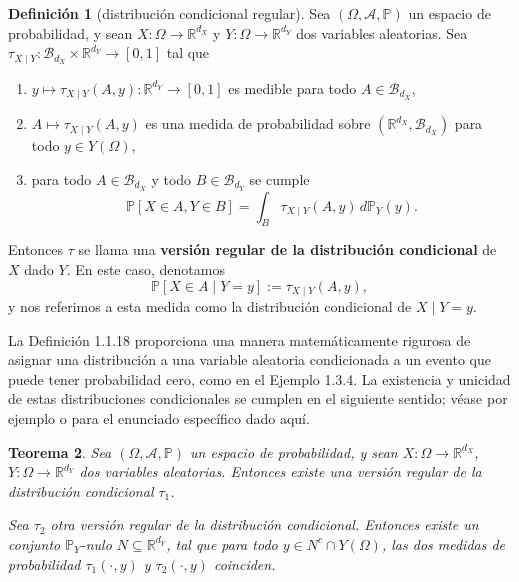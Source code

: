 \documentclass[11pt]{report}
\newenvironment{tcolorbox}[1][]{\par\medskip\noindent\ignorespaces}{\par\medskip}
\theoremstyle{definition}
\newtheorem{definicion}{Definición}[section]
\theoremstyle{plain}
\newtheorem{teorema}[definicion]{Teorema}
\numberwithin{equation}{section}
\begin{document}
\begin{tcolorbox}[colback=blue!8, colframe=blue!8, boxrule=0pt]
\begin{definicion}[distribución condicional regular]
Sea \((\Omega,\mathcal{A},\mathbb{P})\) un espacio de probabilidad, y sean \(X:\Omega\to\mathbb{R}^{d_X}\) y \(Y:\Omega\to\mathbb{R}^{d_Y}\) dos variables aleatorias. Sea \(\tau_{X\mid Y}:\mathcal{B}_{d_X}\times\mathbb{R}^{d_Y}\to[0,1]\) tal que

\begin{enumerate}
    \item[(i)] \(y\mapsto\tau_{X\mid Y}(A,y):\mathbb{R}^{d_Y}\to[0,1]\) es medible para todo \(A\in\mathcal{B}_{d_X}\),
    \item[(ii)] \(A\mapsto\tau_{X\mid Y}(A,y)\) es una medida de probabilidad sobre \((\mathbb{R}^{d_X},\mathcal{B}_{d_X})\) para todo \(y\in Y(\Omega)\),
    \item[(iii)] para todo \(A\in\mathcal{B}_{d_X}\) y todo \(B\in\mathcal{B}_{d_Y}\) se cumple
    \begin{equation*}
        \mathbb{P}[X\in A,Y\in B]
        =
        \int_B\tau_{X\mid Y}(A,y)\,d\mathbb{P}_Y(y).
    \end{equation*}
\end{enumerate}

Entonces \(\tau\) se llama una \textbf{versión regular de la distribución condicional} de \(X\) dado \(Y\). En este caso, denotamos
\begin{equation*}
    \mathbb{P}[X\in A\mid Y=y]
    :=
    \tau_{X\mid Y}(A,y),
\end{equation*}
y nos referimos a esta medida como la distribución condicional de \(X\mid Y=y\).
\end{definicion}
\end{tcolorbox}

La Definición 1.1.18 proporciona una manera matemáticamente rigurosa de asignar una distribución a una variable aleatoria condicionada a un evento que puede tener probabilidad cero, como en el Ejemplo 1.3.4. La existencia y unicidad de estas distribuciones condicionales se cumplen en el siguiente sentido; véase por ejemplo \cite[Capítulo 8]{klenke-2014} o \cite[Capítulo 3]{durrett-2019} para el enunciado específico dado aquí.

\begin{tcolorbox}[colback=blue!8, colframe=blue!8, boxrule=0pt]
\begin{teorema}
Sea \((\Omega,\mathcal{A},\mathbb{P})\) un espacio de probabilidad, y sean \(X:\Omega\to\mathbb{R}^{d_X}\), \(Y:\Omega\to\mathbb{R}^{d_Y}\) dos variables aleatorias. Entonces existe una versión regular de la distribución condicional \(\tau_1\).

Sea \(\tau_2\) otra versión regular de la distribución condicional. Entonces existe un conjunto \(\mathbb{P}_Y\)-nulo \(N\subseteq\mathbb{R}^{d_Y}\), tal que para todo \(y\in N^c\cap Y(\Omega)\), las dos medidas de probabilidad \(\tau_1(\cdot,y)\) y \(\tau_2(\cdot,y)\) coinciden.
\end{teorema}
\end{tcolorbox}
\end{document}
